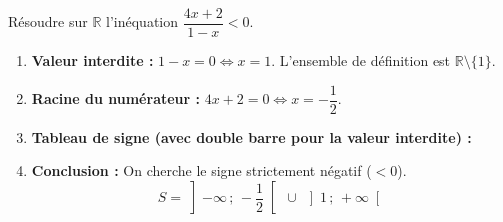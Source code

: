 \begin{methode}
	Résoudre sur $\mathbb{R}$ l'inéquation $\dfrac{4x + 2}{1 - x} < 0$.

	\begin{correction}
		\nline
		\begin{enumerate}
			\item \textbf{Valeur interdite :} $1 - x = 0 \iff x = 1$. L'ensemble de définition est $\mathbb{R} \setminus \{1\}$.
			\item \textbf{Racine du numérateur :} $4x + 2 = 0 \iff x = -\dfrac{1}{2}$.
			\item \textbf{Tableau de signe (avec double barre pour la valeur interdite) :}
			      \begin{center}
			      \end{center}
			\item \textbf{Conclusion :} On cherche le signe strictement négatif ($< 0$).
			      \[
				      S = \left] -\infty\,;\, - \frac{1}{2} \right[\  \cup \ \left] 1\,;\, + \infty \right[
			      \]
		\end{enumerate}
	\end{correction}
\end{methode}

